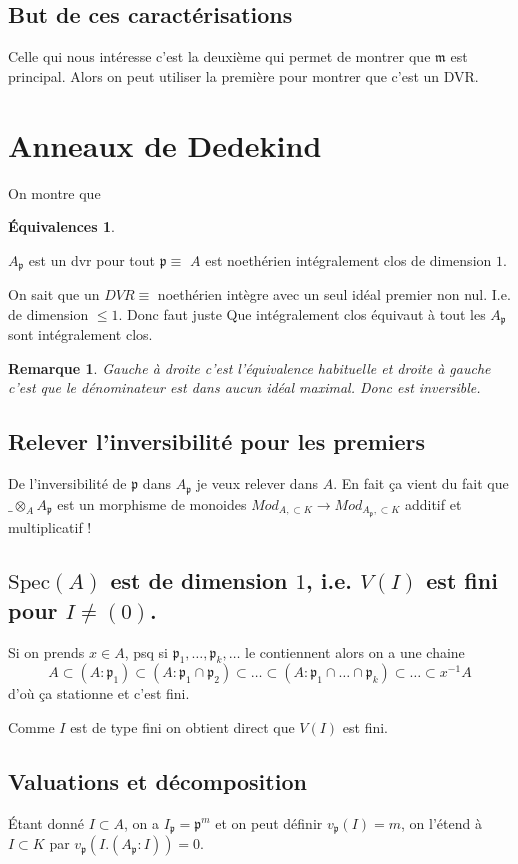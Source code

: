 \documentclass[a4paper,12pt]{book}
\newcommand{\m}{\mathfrak m}
\newcommand{\p}{\mathfrak p}
\newcommand{\Spec}{\textrm{Spec}}
\theoremstyle{plain}
\newtheorem{rem}{Remarque}
\theoremstyle{definition}
\newtheorem*{eq}{Équivalences}
\theoremstyle{remark}
\begin{document}
\subsection{But de ces caractérisations}
Celle qui nous intéresse c'est la deuxième qui permet de montrer
que $\m$ est principal. Alors on peut utiliser la première
pour montrer que c'est un DVR.

\section{Anneaux de Dedekind}
On montre que 
\begin{eq}
    \begin{center}
	$A_\p$ est un dvr pour tout $\p\equiv$ $A$ est
	noethérien intégralement clos de dimension $1$.
    \end{center}
\end{eq}
On sait que un $DVR\equiv$ noethérien intègre avec un seul
idéal premier non nul. I.e. de dimension $\leq 1$. Donc faut juste
Que intégralement clos équivaut à tout les $A_\p$ sont 
intégralement clos.
\begin{rem}
    Gauche à droite c'est l'équivalence habituelle et droite à
    gauche c'est que le dénominateur est dans aucun idéal maximal.
    Donc est inversible.
\end{rem}


\subsection{Relever l'inversibilité pour les premiers}
De l'inversibilité de $\p$ dans $A_\p$ je veux relever dans $A$.
En fait ça vient du fait que $\_\otimes_A A_\p$ est un morphisme
de monoides $Mod_{A,\subset K}\to Mod_{A_\p,\subset K}$ additif
et multiplicatif !

\subsection{$\Spec(A)$ est de dimension $1$, i.e. $V(I)$ est fini
pour $I\ne (0)$.}

Si on prends $x\in A$, psq si $\p_1,\ldots,\p_k,\ldots$ le
contiennent alors on a une chaine 
\[A\subset (A:\p_1)\subset (A:\p_1\cap \p_2)\subset \ldots\subset
(A:\p_1\cap\ldots\cap \p_k)\subset \ldots\subset x^{-1}A\]
d'où ça stationne et c'est fini. 

Comme $I$ est de type fini on obtient direct que $V(I)$ est fini.
\subsection{Valuations et décomposition}
Étant donné $I\subset A$, on a $I_\p=\p^m$ et on peut définir
$v_\p(I)=m$, on l'étend à $I\subset K$ par $v_\p(I.(A_\p:I))=0$.
\end{document}
